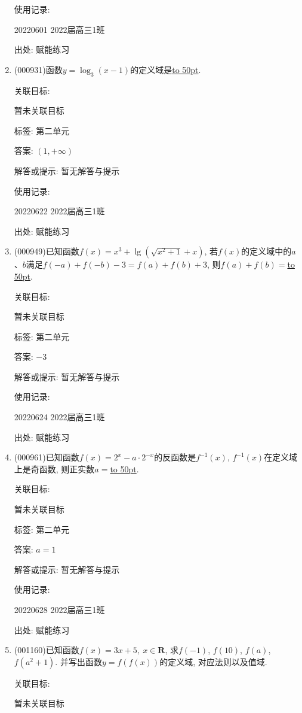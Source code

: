 \documentclass[10pt,a4paper]{article}
\newcommand{\blank}[1]{\underline{\hbox to #1pt{}}}
\begin{document}
\begin{enumerate}[1.]
使用记录:

20220601	2022届高三1班	


出处: 赋能练习
\item { (000931)}函数$y=\log_3 (x-1)$的定义域是\blank{50}.


关联目标:

暂未关联目标



标签: 第二单元

答案: $(1,+\infty)$

解答或提示: 暂无解答与提示

使用记录:

20220622	2022届高三1班	


出处: 赋能练习
\item { (000949)}已知函数$f(x)={x^3}+\lg (\sqrt{x^2+1}+x)$, 若$f(x)$的定义域中的$a$、$b$满足$f(-a)+f(-b)-3=f(a)+f(b)+3$, 则$f(a)+f(b)=$\blank{50}.


关联目标:

暂未关联目标



标签: 第二单元

答案: $-3$

解答或提示: 暂无解答与提示

使用记录:

20220624	2022届高三1班	


出处: 赋能练习
\item { (000961)}已知函数$f(x)=2^x-a\cdot 2^{-x}$的反函数是$f^{-1}(x)$, $f^{-1}(x)$在定义域上是奇函数, 则正实数$a=$\blank{50}.


关联目标:

暂未关联目标



标签: 第二单元

答案: $a=1$

解答或提示: 暂无解答与提示

使用记录:

20220628	2022届高三1班	


出处: 赋能练习
\item { (001160)}已知函数$f(x)=3x+5, \ x\in \mathbf{R}$, 求$f(-1)$, $f(10)$, $f(a)$, $f(a^2+1)$. 并写出函数$y=f(f(x))$的定义域, 对应法则以及值域.


关联目标:

暂未关联目标




\end{enumerate}
\end{document}
